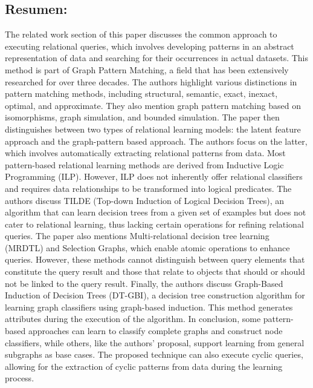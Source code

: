 \documentclass{article}%
\begin{document}
\subsection{Resumen:}%
\label{subsec:Resumen}%
The related work section of this paper discusses the common approach to executing relational queries, which involves developing patterns in an abstract representation of data and searching for their occurrences in actual datasets. This method is part of Graph Pattern Matching, a field that has been extensively researched for over three decades. The authors highlight various distinctions in pattern matching methods, including structural, semantic, exact, inexact, optimal, and approximate. They also mention graph pattern matching based on isomorphisms, graph simulation, and bounded simulation.\newline%
\newline%
The paper then distinguishes between two types of relational learning models: the latent feature approach and the graph{-}pattern based approach. The authors focus on the latter, which involves automatically extracting relational patterns from data.\newline%
\newline%
Most pattern{-}based relational learning methods are derived from Inductive Logic Programming (ILP). However, ILP does not inherently offer relational classifiers and requires data relationships to be transformed into logical predicates. The authors discuss TILDE (Top{-}down Induction of Logical Decision Trees), an algorithm that can learn decision trees from a given set of examples but does not cater to relational learning, thus lacking certain operations for refining relational queries.\newline%
\newline%
The paper also mentions Multi{-}relational decision tree learning (MRDTL) and Selection Graphs, which enable atomic operations to enhance queries. However, these methods cannot distinguish between query elements that constitute the query result and those that relate to objects that should or should not be linked to the query result.\newline%
\newline%
Finally, the authors discuss Graph{-}Based Induction of Decision Trees (DT{-}GBI), a decision tree construction algorithm for learning graph classifiers using graph{-}based induction. This method generates attributes during the execution of the algorithm.\newline%
\newline%
In conclusion, some pattern{-}based approaches can learn to classify complete graphs and construct node classifiers, while others, like the authors' proposal, support learning from general subgraphs as base cases. The proposed technique can also execute cyclic queries, allowing for the extraction of cyclic patterns from data during the learning process.
\end{document}

